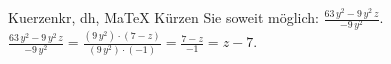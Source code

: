 \begin{MAufgabe}{Kuerzen}{kr, dh, MaTeX}
K\"urzen Sie soweit m\"oglich: $\frac{63\, y^2 - 9\, y^2\, z}{- 9\, y^2}$.\\ 
\ifLsg\MLoesung
\quad $\frac{63\, y^2 - 9\, y^2\, z}{- 9\, y^2}=\frac{(9\, y^2)\cdot(7 - z)}{(9\, y^2)\cdot(-1)}=\frac{7 - z}{-1}=z - 7$.\else\relax\fi
 \end{MAufgabe}